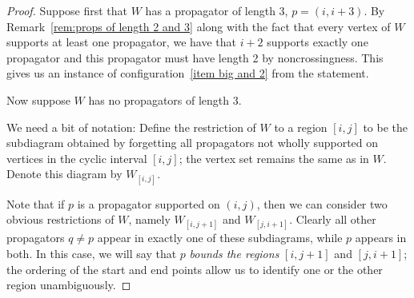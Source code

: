 \documentclass[11pt]{article}
\theoremstyle{remark}
\theoremstyle{definition}
\begin{document}
\begin{proof}
  Suppose first that $W$ has a propagator of length $3$, $p=(i, i+3)$.  By Remark~\ref{rem:props of length 2 and 3} along with the fact that every vertex of $W$ supports at least one propagator, we have that $i+2$ supports exactly one propagator and this propagator must have length 2 by noncrossingness.  This gives us an instance of configuration~\ref{item big and 2} from the statement.

  Now suppose $W$ has no propagators of length $3$.
%
%
%
%
%
%
%

We need a bit of notation:
Define the restriction of $W$ to a region $[i,j]$ to be the subdiagram obtained by forgetting all propagators not wholly supported on vertices in the cyclic interval $[i,j]$; the vertex set remains the same as in $W$.  Denote this diagram by $W_{[i,j]}$.

Note that if $p$ is a propagator supported on $(i,j)$, then we can consider two obvious restrictions of $W$, namely $W_{[i,j+1]}$ and $W_{[j,i+1]}$.  Clearly all other propagators $q\neq p$ appear in exactly one of these subdiagrams, while $p$ appears in both.  In this case, we will say that $p$ \textit{bounds the regions} $[i,j+1]$ and $[j,i+1]$; the ordering of the start and end points allow us to identify one or the other region unambiguously.


\end{proof}
\end{document}
